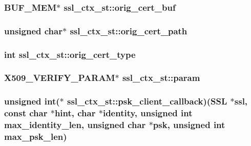 \hypertarget{structssl__ctx__st_a70c9176a9cda09b90348ab7537f8ff16}{
\subsubsection[{orig\-\_\-cert\-\_\-buf}]{\setlength{\rightskip}{0pt plus 5cm}B\-U\-F\-\_\-\-M\-E\-M$\ast$ ssl\-\_\-ctx\-\_\-st\-::orig\-\_\-cert\-\_\-buf}}\label{structssl__ctx__st_a70c9176a9cda09b90348ab7537f8ff16}
\hypertarget{structssl__ctx__st_a41274e3c49c8334d13125361709ac777}{
\subsubsection[{orig\-\_\-cert\-\_\-path}]{\setlength{\rightskip}{0pt plus 5cm}unsigned char$\ast$ ssl\-\_\-ctx\-\_\-st\-::orig\-\_\-cert\-\_\-path}}\label{structssl__ctx__st_a41274e3c49c8334d13125361709ac777}
\hypertarget{structssl__ctx__st_a4fac4322a2a963b98bd06a02d6a12d6f}{
\subsubsection[{orig\-\_\-cert\-\_\-type}]{\setlength{\rightskip}{0pt plus 5cm}int ssl\-\_\-ctx\-\_\-st\-::orig\-\_\-cert\-\_\-type}}\label{structssl__ctx__st_a4fac4322a2a963b98bd06a02d6a12d6f}
\hypertarget{structssl__ctx__st_a27c15c2ea4e216baacb44a5bf166cfa1}{
\subsubsection[{param}]{\setlength{\rightskip}{0pt plus 5cm}X509\-\_\-\-V\-E\-R\-I\-F\-Y\-\_\-\-P\-A\-R\-A\-M$\ast$ ssl\-\_\-ctx\-\_\-st\-::param}}\label{structssl__ctx__st_a27c15c2ea4e216baacb44a5bf166cfa1}
\hypertarget{structssl__ctx__st_a00d596286421b49966ee80ef715dd21d}{
\subsubsection[{psk\-\_\-client\-\_\-callback}]{\setlength{\rightskip}{0pt plus 5cm}unsigned int($\ast$ ssl\-\_\-ctx\-\_\-st\-::psk\-\_\-client\-\_\-callback)(S\-S\-L $\ast$ssl, const char $\ast$hint, char $\ast$identity, unsigned int max\-\_\-identity\-\_\-len, unsigned char $\ast$psk, unsigned int max\-\_\-psk\-\_\-len)}}\label{structssl__ctx__st_a00d596286421b49966ee80ef715dd21d}
